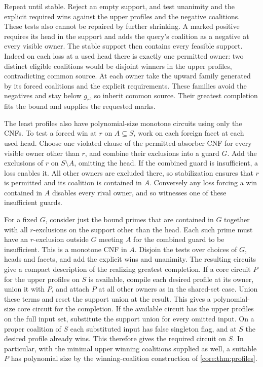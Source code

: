 Repeat until stable. Reject an empty support, and test
unanimity and the explicit required wins against the
upper profiles and the negative coalitions. These tests
also cannot be repaired by further shrinking. A marked
positive requires its head in the support and adds
the query's coalition as a negative at every visible
owner. The stable support then contains every feasible
support. Indeed on each loss at a used head there is
exactly one permitted owner: two distinct eligible
coalitions would be disjoint winners in the upper
profiles, contradicting common source. At each owner
take the upward family generated by its forced
coalitions and the explicit requirements. These
families avoid the negatives and stay below $g_r$,
so inherit common source. Their greatest completion
fits the bound and supplies the requested marks.

The least profiles also have polynomial-size monotone
circuits using only the CNFs. To test a forced win at
$r$ on $A\subseteq S$, work on each foreign facet at
each used head. Choose one violated clause of the
permitted-absorber CNF for every visible owner other
than $r$, and combine their exclusions into a guard
$G$. Add the exclusions of $r$ on $S\setminus A$,
omitting the head. If the combined guard is
insufficient, a loss enables it. All other owners
are excluded there, so stabilization ensures that
$r$ is permitted and its coalition is contained in
$A$. Conversely any loss forcing a win contained in
$A$ disables every rival owner, and so witnesses one
of these insufficient guards.

For a fixed $G$, consider just the bound primes that
are contained in $G$ together with all $r$-exclusions
on the support other than the head. Each such prime
must have an $r$-exclusion outside $G$ meeting $A$
for the combined guard to be insufficient. This is
a monotone CNF in $A$. Disjoin the tests over choices
of $G$, heads and facets, and add the explicit wins
and unanimity. The resulting circuits give a compact
description of the realizing greatest completion.
If a core circuit $P$ for the upper profiles on $S$
is available, compile each desired profile at its
owner, union it with $P$, and attach $P$ at all other
owners as in the shared-set case. Union these terms
and reset the support union at the result. This gives
a polynomial-size core circuit for the completion.
If the available circuit has the upper profiles on
the full input set, substitute the support union for
every omitted input. On a proper coalition of $S$
each substituted input has false singleton flag, and
at $S$ the desired profile already wins. This therefore
gives the required circuit on $S$.
In particular, with the minimal upper winning
coalitions supplied as well, a suitable $P$ has
polynomial size by the winning-coalition construction
of \cref{core:thm:profiles}.

